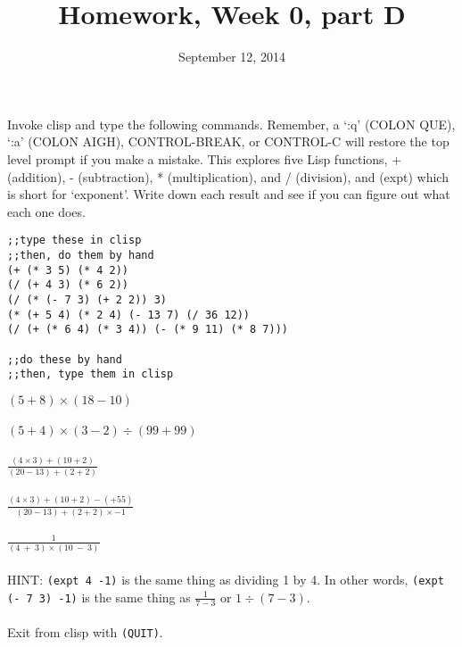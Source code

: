 \documentclass{article}
\title{Homework, Week 0, part D}
\date{September 12, 2014}
\begin{document}
\maketitle{}
\lstset{language=Lisp}

\paragraph{}Invoke clisp and type the following commands. Remember, a `:q' (COLON QUE), `:a' (COLON AIGH), CONTROL-BREAK, or CONTROL-C will restore the top level prompt if you make a mistake. This explores five Lisp functions, + (addition), - (subtraction), * (multiplication), and / (division), and (expt) which is short for `exponent'. Write down each result and see if you can figure out what each one does.\\

\begin{lstlisting}
;;type these in clisp
;;then, do them by hand
(+ (* 3 5) (* 4 2))
(/ (+ 4 3) (* 6 2))
(/ (* (- 7 3) (+ 2 2)) 3)
(* (+ 5 4) (* 2 4) (- 13 7) (/ 36 12))
(/ (+ (* 6 4) (* 3 4)) (- (* 9 11) (* 8 7)))

;;do these by hand
;;then, type them in clisp
\end{lstlisting}
$(5 + 8) \times (18 - 10)$ \\
\\
$(5 + 4) \times (3 - 2) \div (99 + 99)$\\
\\
$\frac{(4 \times 3) + (10 + 2)}{(20 - 13) + (2 + 2)}$ \\
\\
$\frac{(4 \times 3) + (10 + 2) - (+ 5 5)}{(20 - 13) + (2 + 2) \times -1}$ \\
\\
$\frac{1}{( 4 \:+ \: 3) \times (10 \:- \:    3)}$ \\
\\
HINT: \texttt{(expt 4 -1)} is the same thing as dividing 1 by 4. In other words, \texttt{(expt (- 7 3) -1)} is the same thing as $\frac{1}{7 - 3}$ or $1 \div (7 - 3)$. \\


\paragraph{}Exit from clisp with \texttt{(QUIT)}.
\end{document}
